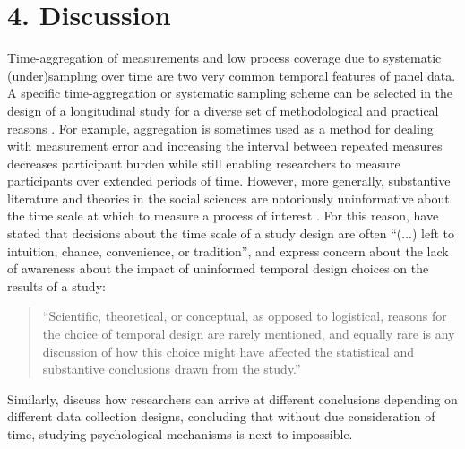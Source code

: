 \documentclass[man]{apa7} %
\begin{document}
\section{4. Discussion}
Time-aggregation of measurements and low process coverage due to systematic (under)sampling over time are two very common temporal features of panel data. A specific time-aggregation or systematic sampling scheme can be selected in the design of a longitudinal study for a diverse set of methodological and practical reasons \parencites{dollard_timing_2014, janssens_qualitative_2018}. For example, aggregation is sometimes used as a method for dealing with measurement error \parencite{rushton_behavioral_1983} and increasing the interval between repeated measures decreases participant burden while still enabling researchers to measure participants over extended periods of time. However, more generally, substantive literature and theories in the social sciences are notoriously uninformative about the time scale at which to measure a process of interest \parencite{collins_analysis_2006, dormann_optimal_2015}. For this reason, \textcite[p. 533]{mitchell_building_2001} have stated that decisions about the time scale of a study design are often ``(...) left to intuition, chance, convenience, or tradition'', and \textcite[p. S85]{collins_effect_2002} express concern about the lack of awareness about the impact of uninformed temporal design choices on the results of a study: \begin{quote} ``Scientific, theoretical, or conceptual, as opposed to logistical, reasons for the choice of temporal design are rarely mentioned, and equally rare is any discussion of how this choice might have affected the statistical and substantive conclusions drawn from the study.'' \end{quote} Similarly, \textcite{voelkle_role_2018} discuss how researchers can arrive at different conclusions depending on different data collection designs, concluding that without due consideration of time, studying psychological mechanisms is next to impossible. 
\end{document}
